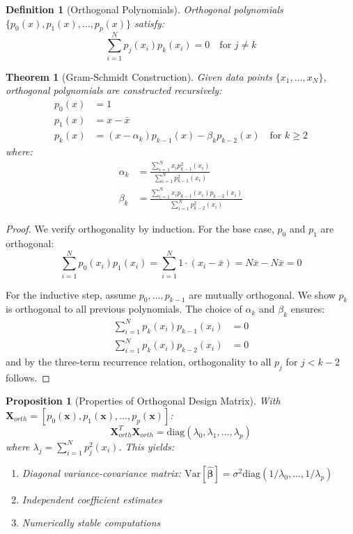 \documentclass{article}
\newtheorem{definition}{Definition}
\newtheorem{theorem}{Theorem}
\newtheorem{proposition}{Proposition}
\begin{document}
\begin{definition}[Orthogonal Polynomials]
Orthogonal polynomials $\{p_0(x), p_1(x), \ldots, p_p(x)\}$ satisfy:
\begin{equation}
\sum_{i=1}^N p_j(x_i)p_k(x_i) = 0 \quad \text{for } j \neq k
\end{equation}
\end{definition}

\begin{theorem}[Gram-Schmidt Construction]
Given data points $\{x_1, \ldots, x_N\}$, orthogonal polynomials are constructed recursively:
\begin{align}
p_0(x) &= 1 \\
p_1(x) &= x - \bar{x} \\
p_k(x) &= (x - \alpha_k)p_{k-1}(x) - \beta_k p_{k-2}(x) \quad \text{for } k \geq 2
\end{align}
where:
\begin{align}
\alpha_k &= \frac{\sum_{i=1}^N x_i p_{k-1}^2(x_i)}{\sum_{i=1}^N p_{k-1}^2(x_i)} \\
\beta_k &= \frac{\sum_{i=1}^N x_i p_{k-1}(x_i)p_{k-2}(x_i)}{\sum_{i=1}^N p_{k-2}^2(x_i)}
\end{align}
\end{theorem}

\begin{proof}
We verify orthogonality by induction. For the base case, $p_0$ and $p_1$ are orthogonal:
\begin{equation}
\sum_{i=1}^N p_0(x_i)p_1(x_i) = \sum_{i=1}^N 1 \cdot (x_i - \bar{x}) = N\bar{x} - N\bar{x} = 0
\end{equation}

For the inductive step, assume $p_0, \ldots, p_{k-1}$ are mutually orthogonal. We show $p_k$ is orthogonal to all previous polynomials. The choice of $\alpha_k$ and $\beta_k$ ensures:
\begin{align}
\sum_{i=1}^N p_k(x_i)p_{k-1}(x_i) &= 0 \\
\sum_{i=1}^N p_k(x_i)p_{k-2}(x_i) &= 0
\end{align}
and by the three-term recurrence relation, orthogonality to all $p_j$ for $j < k-2$ follows.
\end{proof}

\begin{proposition}[Properties of Orthogonal Design Matrix]
With $\mathbf{X}_{orth} = [p_0(\mathbf{x}), p_1(\mathbf{x}), \ldots, p_p(\mathbf{x})]$:
\begin{equation}
\mathbf{X}_{orth}^T\mathbf{X}_{orth} = \text{diag}(\lambda_0, \lambda_1, \ldots, \lambda_p)
\end{equation}
where $\lambda_j = \sum_{i=1}^N p_j^2(x_i)$. This yields:
\begin{enumerate}
    \item Diagonal variance-covariance matrix: $\text{Var}[\hat{\boldsymbol{\beta}}] = \sigma^2 \text{diag}(1/\lambda_0, \ldots, 1/\lambda_p)$
    \item Independent coefficient estimates
    \item Numerically stable computations
\end{enumerate}
\end{proposition}
\end{document}
